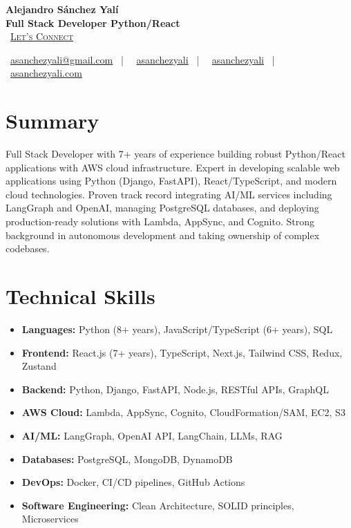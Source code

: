 \documentclass[letterpaper,11pt]{article}
\newcommand{\normalfaCalendar}{{\mdseries\faCalendar}}
\newcommand{\normalfaEnvelope}{{\mdseries\faEnvelope}}
\newcommand{\normalfaLinkedin}{{\mdseries\faLinkedin}}
\newcommand{\normalfaGithub}{{\mdseries\faGithub}}
\newcommand{\normalfaGlobe}{{\mdseries\faGlobe}}
\begin{document}
\begin{center}
\textbf{\Huge Alejandro Sánchez Yalí}\\[0.2em]
\textbf{\Large Full Stack Developer Python/React}\\[0.4em]
\small
\normalfaCalendar\ \href{https://cal.com/asanchezyali/full-time-opportunities}{\textsc{Let's Connect}}

\vspace{0.8em}
\normalfaEnvelope\ \href{mailto:asanchezyali@gmail.com}{asanchezyali@gmail.com}  ~|~
\normalfaLinkedin\ \href{https://www.linkedin.com/in/asanchezyali}{asanchezyali} ~|~
\normalfaGithub\ \href{https://github.com/asanchezyali}{asanchezyali}  ~|~
\normalfaGlobe\ \href{https://asanchezyali.com}{asanchezyali.com}
\end{center}

\section{Summary}
Full Stack Developer with 7+ years of experience building robust Python/React applications with AWS cloud infrastructure. Expert in developing scalable web applications using Python (Django, FastAPI), React/TypeScript, and modern cloud technologies. Proven track record integrating AI/ML services including LangGraph and OpenAI, managing PostgreSQL databases, and deploying production-ready solutions with Lambda, AppSync, and Cognito. Strong background in autonomous development and taking ownership of complex codebases.

\section{Technical Skills}
\begin{itemize}[leftmargin=*, itemsep=0pt]
  \item \textbf{Languages:} Python (8+ years), JavaScript/TypeScript (6+ years), SQL
  \item \textbf{Frontend:} React.js (7+ years), TypeScript, Next.js, Tailwind CSS, Redux, Zustand
  \item \textbf{Backend:} Python, Django, FastAPI, Node.js, RESTful APIs, GraphQL
  \item \textbf{AWS Cloud:} Lambda, AppSync, Cognito, CloudFormation/SAM, EC2, S3
  \item \textbf{AI/ML:} LangGraph, OpenAI API, LangChain, LLMs, RAG
  \item \textbf{Databases:} PostgreSQL, MongoDB, DynamoDB
  \item \textbf{DevOps:} Docker, CI/CD pipelines, GitHub Actions
  \item \textbf{Software Engineering:} Clean Architecture, SOLID principles, Microservices
\end{itemize}
\end{document}
